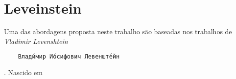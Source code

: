 \section{Leveinstein} %
\label{sec:leveinstein}

Uma das abordagens proposta neste trabalho são baseadas nos trabalhos de \textit{Vladimir Levenshtein} 
\begin{verbatim}
	Влади́мир Ио́сифович Левенште́йн
\end{verbatim}. Nascido em 

